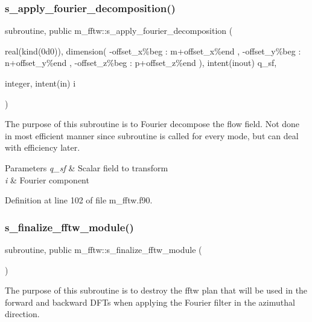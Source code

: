 \subsubsection{\texorpdfstring{s\+\_\+apply\+\_\+fourier\+\_\+decomposition()}{s\_apply\_fourier\_decomposition()}}
{\footnotesize\ttfamily subroutine, public m\+\_\+fftw\+::s\+\_\+apply\+\_\+fourier\+\_\+decomposition (\begin{DoxyParamCaption}\item[{real(kind(0d0)), dimension( -\/offset\+\_\+x\%beg \+: m+offset\+\_\+x\%end  ,                        -\/offset\+\_\+y\%beg \+: n+offset\+\_\+y\%end  ,                        -\/offset\+\_\+z\%beg \+: p+offset\+\_\+z\%end ), intent(inout)}]{q\+\_\+sf,  }\item[{integer, intent(in)}]{i }\end{DoxyParamCaption})}



The purpose of this subroutine is to Fourier decompose the flow field. Not done in most efficient manner since subroutine is called for every mode, but can deal with efficiency later. 


\begin{DoxyParams}{Parameters}
{\em q\+\_\+sf} & Scalar field to transform \\
\hline
{\em i} & Fourier component \\
\hline
\end{DoxyParams}


Definition at line 102 of file m\+\_\+fftw.\+f90.

\mbox{\label{namespacem__fftw_a0666fa4d38fb46540fd108b76e835b45}} 
\subsubsection{\texorpdfstring{s\+\_\+finalize\+\_\+fftw\+\_\+module()}{s\_finalize\_fftw\_module()}}
{\footnotesize\ttfamily subroutine, public m\+\_\+fftw\+::s\+\_\+finalize\+\_\+fftw\+\_\+module (\begin{DoxyParamCaption}{ }\end{DoxyParamCaption})}



The purpose of this subroutine is to destroy the fftw plan that will be used in the forward and backward D\+F\+Ts when applying the Fourier filter in the azimuthal direction. 



